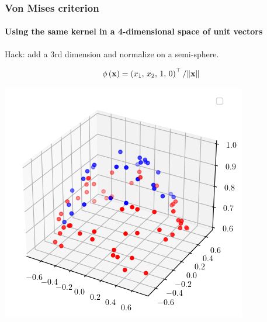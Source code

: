 \documentclass{beamer}
\begin{document}
    \begin{frame}
        \frametitle{Von Mises criterion}
        \framesubtitle{Using the same kernel in a 4-dimensional space of unit vectors}
        
        \begin{minipage}{.45\textwidth}
            Hack: add a 3rd dimension and normalize on a semi-sphere.
            
            \[
                \phi\left( \mathbf{x} \right) = \left( x_1,\, x_2,\, 1,\, 0 \right)^\top / \norm*{\mathbf{x}}
                \]
        \end{minipage}
        \begin{minipage}{.45\textwidth}
            \centering
            \includegraphics[width=.65\textwidth]{pics/vm-data-sphere-projection.png}
        \end{minipage}


\end{frame}
\end{document}
